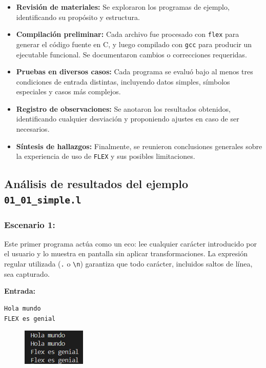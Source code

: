 \documentclass{article}
\begin{document}
\begin{itemize}
    \item \textbf{Revisión de materiales:} Se exploraron los programas de ejemplo, identificando su propósito y estructura.
    \item \textbf{Compilación preliminar:} Cada archivo fue procesado con \texttt{flex} para generar el código fuente en C, y luego compilado con \texttt{gcc} para producir un ejecutable funcional. Se documentaron cambios o correcciones requeridas.
    \item \textbf{Pruebas en diversos casos:} Cada programa se evaluó bajo al menos tres condiciones de entrada distintas, incluyendo datos simples, símbolos especiales y casos más complejos.
    \item \textbf{Registro de observaciones:} Se anotaron los resultados obtenidos, identificando cualquier desviación y proponiendo ajustes en caso de ser necesarios.
    \item \textbf{Síntesis de hallazgos:} Finalmente, se reunieron conclusiones generales sobre la experiencia de uso de \texttt{FLEX} y sus posibles limitaciones.
\end{itemize}

\subsection{Análisis de resultados del ejemplo \texttt{01\_01\_simple.l}}

\subsubsection{Escenario 1: }

Este primer programa actúa como un eco: lee cualquier carácter introducido por el usuario y lo muestra en pantalla sin aplicar transformaciones. La expresión regular utilizada (\verb|.| o \verb|\n|) garantiza que todo carácter, incluidos saltos de línea, sea capturado.

\textbf{Entrada:}  
\begin{verbatim}
Hola mundo
FLEX es genial
\end{verbatim}

\begin{figure}[H]
    \centering
    \includegraphics[width=0.5\linewidth]{image.png}
\end{figure}
\end{document}
